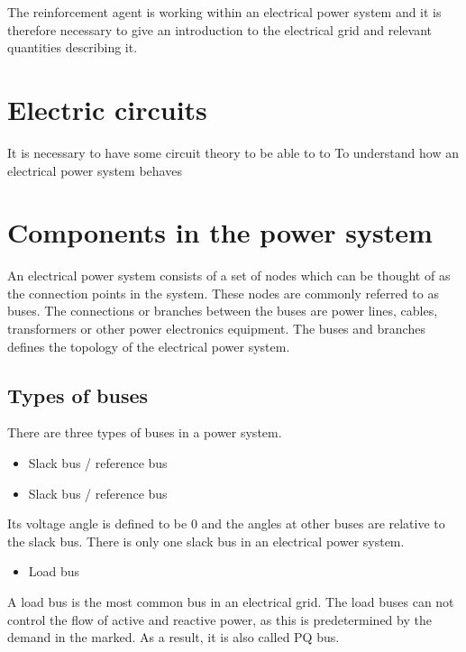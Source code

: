 \documentclass[class=book, crop=false]{standalone}
\begin{document}
The reinforcement agent is working within an electrical power system and it is therefore necessary to give an introduction to the electrical grid and relevant quantities describing it. 

\section{Electric circuits}
It is necessary to have some circuit theory to be able to  to To understand how an electrical power system behaves 

\section{Components in the power system}
An electrical power system consists of a set of nodes which can be thought of as the connection points in the system. These nodes are commonly referred to as buses. The connections or branches between the buses are power lines, cables, transformers or other power electronics equipment. The buses and branches defines the topology of the electrical power system.

\subsection{Types of buses}
There are three types of buses in a power system\cite{opf_intro}.

\begin{itemize}
  \item Slack bus / reference bus
\end{itemize}



\begin{itemize}
  \item Slack bus / reference bus
\end{itemize}
Its voltage angle is defined to be 0 and the angles at other buses are relative to the slack bus. There is only one slack bus in an electrical power system.

\begin{itemize}
  \item Load bus
\end{itemize}
A load bus is the most common bus in an electrical grid. The load buses can not control the flow of active and reactive power, as this is predetermined by the demand in the marked. As a result, it is also called PQ bus.
\end{document}
